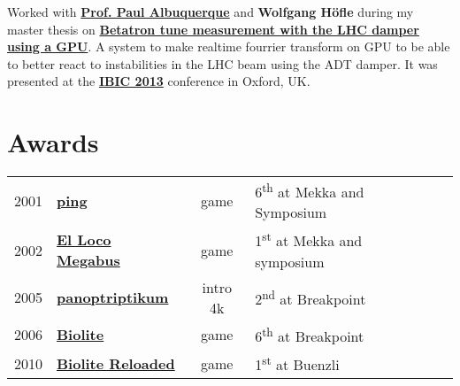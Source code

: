 \documentclass[a4paper]{deedy-resume} %
\begin{document}
\begin{minipage}[t]{0.66\textwidth}
Worked with
\textbf{\href{http://ch.linkedin.com/pub/paul-albuquerque/12/366/809}{Prof. Paul Albuquerque}}
and \textbf{Wolfgang Höf\/le} during my master thesis on
\textbf{\href{http://cds.cern.ch/record/1545785?ln=en}{Betatron tune measurement
with the LHC damper using a GPU}}. A system to make realtime fourrier transform
on GPU to be able to better react to instabilities in the LHC beam using the ADT
damper. It was presented at the \textbf{\href{http://www.ibic2013.org}{IBIC 2013}}
conference in Oxford, UK.

\sectionspace %





\section{Awards}

\begin{tabular}{rlcll}
2001 & \textbf{\href{http://www.pouet.net/prod.php?which=5691}{ping}} &
    game & 6\textsuperscript{th} at Mekka and Symposium \\
2002 & \textbf{\href{http://www.pouet.net/prod.php?which=5652}{El Loco Megabus}} &
    game & 1\textsuperscript{st} at Mekka and symposium \\
2005 & \textbf{\href{http://www.pouet.net/prod.php?which=16393}{panoptriptikum}} &
    intro 4k & 2\textsuperscript{nd} at Breakpoint \\
2006 & \textbf{\href{http://www.pouet.net/prod.php?which=24578}{Biolite}} &
    game & 6\textsuperscript{th} at Breakpoint \\
2010 & \textbf{\href{http://www.pouet.net/prod.php?which=55711}{Biolite Reloaded}} &
    game & 1\textsuperscript{st} at Buenzli \\
\end{tabular}



\end{minipage}
\end{document}
